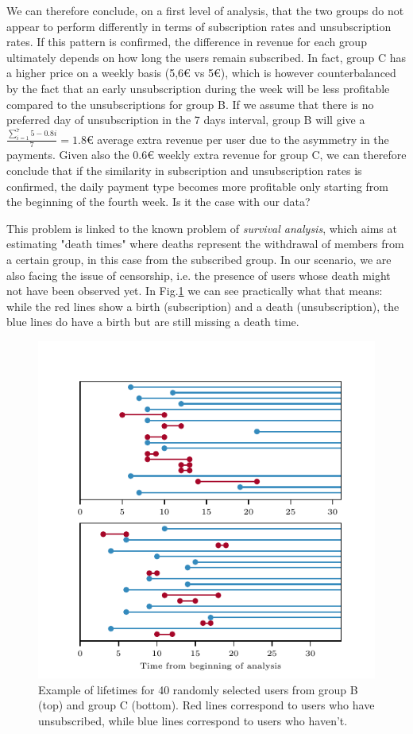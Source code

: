 \documentclass[paper=a4, fontsize=10pt]{report}
\begin{document}
We can therefore conclude, on a first level of analysis, that the two groups do not appear to perform differently in terms of subscription rates and unsubscription rates. If this 
pattern is confirmed, the difference in revenue for each group ultimately depends on how long the users remain subscribed. In fact, group C has a higher
price on a weekly basis (5,6€ vs 5€), which is
however counterbalanced by the fact that an early unsubscription during the week will be less profitable compared to the unsubscriptions for group B. 
If we assume that there is no preferred day of unsubscription in the 7 days interval, group B will give a $ \frac{\sum_{i=1}^{7} 5-0.8i}{7} =1.8$€ average
extra revenue per user due to the asymmetry in the payments. Given also the 0.6€ weekly extra revenue for group C, we can therefore conclude that if the similarity 
in subscription and
unsubscription rates is confirmed, the daily payment type becomes more profitable only starting from the beginning of the fourth week. 
Is it the case with our data?

This problem is linked to the known problem of \textit{survival analysis}, which aims at estimating "death times" where deaths represent the withdrawal of members from a certain group,
in this case from the subscribed group. In our scenario, we are also facing the issue of censorship, i.e. the presence of users whose death might not have been observed yet. In Fig.\ref{fig:lifetimes} we can see practically what that means: while the red lines show a birth (subscription)
and a death (unsubscription), the blue lines do have a birth but are still missing a death time.

\begin{figure}[h!]
\centering
\captionsetup{justification=centering}
\includegraphics[width=.99\columnwidth]{lifetime.pdf}
\caption{Example of lifetimes for 40 randomly selected users from group B (top) and group C (bottom). Red lines
correspond to users who have unsubscribed, while blue lines correspond to users who haven't.}
\label{fig:lifetimes}
\end{figure}
\end{document}
